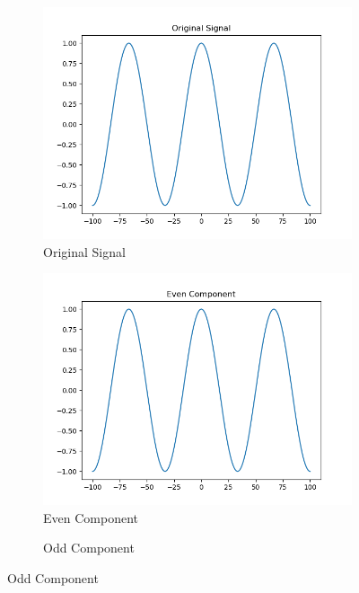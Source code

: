 \documentclass[10pt,a4paper, margin=1in]{article}
\begin{document}
\begin{enumerate}
\begin{enumerate}
\begin{figure}[H]
    \centering
    \begin{subfigure}[t]{0.3\linewidth}
    \centering
        \caption{Original Signal}
        \includegraphics[width=1\linewidth]{assets/q7a/sine_part_a_original.png}
    \end{subfigure}
    \begin{subfigure}[t]{0.3\linewidth}
    \centering
        \caption{Even Component}
        \includegraphics[width=1\linewidth]{assets/q7a/sine_part_a_even.png}
    \end{subfigure}
    \begin{subfigure}[t]{0.3\linewidth}
    \centering
        \caption{Odd Component}

\end{subfigure}
\end{figure}
\end{enumerate}
\end{enumerate}
\end{document}
